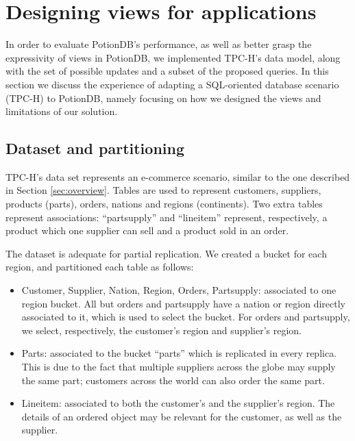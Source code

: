 \documentclass{vldb}
\newcommand{\grumbler}[2]{{\color{red}{\bf #1:} #2}}
\renewcommand{\grumbler}[2]{}
\newcommand{\andre}[1]{\grumbler{andre}{#1}}
\begin{document}
%


\fi

\section{Designing views for applications}

\andre{This probably needs a better title}

In order to evaluate PotionDB's performance, as well as better grasp the expressivity of views in PotionDB, we implemented TPC-H's data model, along with the set of possible updates and a subset of the proposed queries.
In this section we discuss the experience of adapting a SQL-oriented database scenario (TPC-H) to PotionDB, namely focusing on how we designed the views and limitations of our solution.

\subsection{Dataset and partitioning}

TPC-H's \cite{tpch} data set represents an e-commerce scenario, similar to the one described in Section \ref{sec:overview}.
Tables are used to represent customers, suppliers, products (parts), orders, nations and regions (continents).
Two extra tables represent associations: ``partsupply'' and ``lineitem'' represent, respectively, a product which one supplier can sell and a product sold in an order.

The dataset is adequate for partial replication.
We created a bucket for each region, and partitioned each table as follows:

\begin{itemize}
	\item Customer, Supplier, Nation, Region, Orders, Partsupply: associated to one region bucket. 
	All but orders and partsupply have a nation or region directly associated to it, which is used to select the bucket.
	For orders and partsupply, we select, respectively, the customer's region and supplier's region.
	\item Parts: associated to the bucket ``parts'' which is replicated in every replica.
	This is due to the fact that multiple suppliers across the globe may supply the same part; customers across the world can also order the same part.
	\item Lineitem: associated to both the customer's and the supplier's region.
	The details of an ordered object may be relevant for the customer, as well as the supplier.
\end{itemize}
\end{document}
